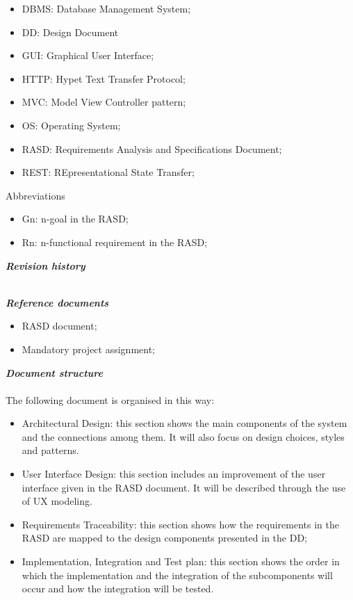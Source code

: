 \begin{legal}
\begin{legal}
\begin{itemize}
					\item DBMS: Database Management System;
					\item DD: Design Document
					\item GUI: Graphical User Interface;
					\item HTTP: Hypet Text Transfer Protocol;
					\item MVC: Model View Controller pattern;
					\item OS: Operating System;
					\item RASD: Requirements Analysis and Specifications Document;
					\item REST: REpresentational State Transfer;
				\end{itemize}
				\item Abbreviations\\
				\begin{itemize}
					\item Gn: n-goal in the RASD;
					\item Rn: n-functional requirement in the RASD;
				\end{itemize}
			\end{legal}
		\item \textit{\textbf{Revision history}}\\\\
		\item \textit{\textbf{Reference documents}}\\
			\begin{itemize}
				\item RASD document;
				\item Mandatory project assignment;
			\end{itemize}
		\item \textit{\textbf{Document structure}}\\\\
		The following document is organised in this way:
		\begin{itemize}
				\item Architectural Design: this section shows the main components of the system and the connections among them. It will also focus on design choices, styles and patterns.
				\item User Interface Design: this section includes an improvement of the user interface given in the RASD document. It will be described through the use of UX modeling.
				\item Requirements Traceability: this section shows how the requirements in the RASD are mapped to the design components presented in the DD;
				\item Implementation, Integration and Test plan: this section shows the order in which the implementation and the integration of the subcomponents will occur and how the integration will be tested.
			\end{itemize}
  	\end{legal}

